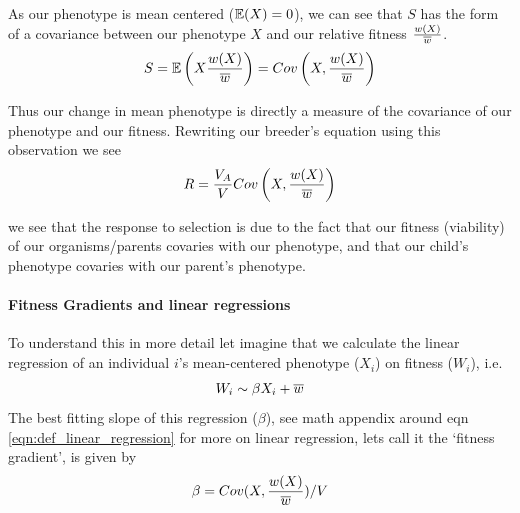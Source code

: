 As our phenotype is mean centered ($\mathbb{E}(X)=0$), we can see that $S$ has
the form of a covariance between our phenotype $X$ and our relative fitness
$\frac{w(X)}{\overline{w}} $. 
\begin{equation}
  S =  \mathbb{E} \left (X
  \frac{w(X)}{\overline{w}} \right) =Cov \left(X, \frac{w(X)}{\overline{w}} \right) \label{S_covar}
\end{equation}

  Thus our change in mean phenotype is directly a measure of the
  covariance of our phenotype and our fitness. 
  Rewriting our breeder's
equation using this observation we see
\begin{equation}
R = \frac{V_A}{V}  Cov \left(X, \frac{w(X)}{\overline{w}} \right)  
\end{equation}

we see that the response to selection is due to the fact that our
fitness (viability) of our organisms/parents covaries with our phenotype, and
that our child's phenotype covaries with our parent's phenotype. 


\paragraph{Fitness Gradients and linear regressions}

To understand this in more detail let imagine that we calculate the
linear regression of an individual $i$'s mean-centered phenotype ($X_i$) on fitness ($W_i$), i.e. 
\begin{equation}
W_i \sim \beta X_i + \overline{w} \label{fitness_regression}
\end{equation}  
The best fitting slope of this regression ($\beta$), see math appendix
around eqn \ref{eqn:def_linear_regression} for more on linear regression, lets call it the
`fitness gradient', is given by
\begin{equation}
  \beta = Cov(X, \frac{w(X)}{\overline{w}} )/ V  \label{beta_covar}
\end{equation}

